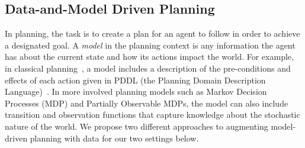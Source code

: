\documentclass[12pt]{article}
\begin{document}




\subsection{Data-and-Model Driven Planning}


In planning, the task is to create a plan for an agent to follow in order to achieve a designated goal. A {\em model} in the planning context is any information the agent has about the current state and how its actions impact the world. For example, in classical planning~\cite{fikes1971strips}, a model includes a description of the pre-conditions and effects of each action given in PDDL (the Planning Domain Description Language)~\cite{mcdermott1998pddl}. In more involved planning models such as Markov Decision Processes (MDP) and Partially Observable MDPs, the model can also include transition and observation functions that capture knowledge about the stochastic nature of the world. We propose two different approaches to augmenting model-driven planning with data for our two settings below.
\end{document}
